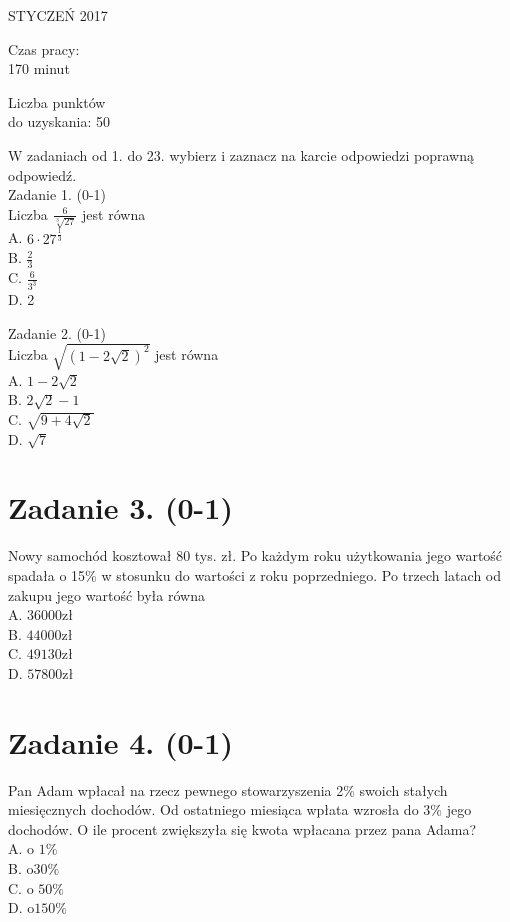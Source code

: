 \documentclass[10pt]{article}
\begin{document}
STYCZEŃ 2017

Czas pracy:\\
170 minut

Liczba punktów\\
do uzyskania: 50

W zadaniach od 1. do 23. wybierz i zaznacz na karcie odpowiedzi poprawną odpowiedź.\\
Zadanie 1. (0-1)\\
Liczba \(\frac{6}{\sqrt[3]{27}}\) jest równa\\
A. \(6 \cdot 27^{\frac{1}{3}}\)\\
B. \(\frac{2}{3}\)\\
C. \(\frac{6}{3^{3}}\)\\
D. 2

Zadanie 2. (0-1)\\
Liczba \(\sqrt{(1-2 \sqrt{2})^{2}}\) jest równa\\
A. \(1-2 \sqrt{2}\)\\
B. \(2 \sqrt{2}-1\)\\
C. \(\sqrt{9+4 \sqrt{2}}\)\\
D. \(\sqrt{7}\)

\section*{Zadanie 3. (0-1)}
Nowy samochód kosztował 80 tys. zł. Po każdym roku użytkowania jego wartość spadała o 15\% w stosunku do wartości z roku poprzedniego. Po trzech latach od zakupu jego wartość była równa\\
A. \(36000 \mathrm{zł}\)\\
B. \(44000 \mathrm{zł}\)\\
C. \(49130 \mathrm{zł}\)\\
D. \(57800 \mathrm{zł}\)

\section*{Zadanie 4. (0-1)}
Pan Adam wpłacał na rzecz pewnego stowarzyszenia 2\% swoich stałych miesięcznych dochodów. Od ostatniego miesiąca wpłata wzrosła do \(3 \%\) jego dochodów. O ile procent zwiększyła się kwota wpłacana przez pana Adama?\\
A. o \(1 \%\)\\
B. \(\mathrm{o} 30 \%\)\\
C. o \(50 \%\)\\
D. \(\mathrm{o} 150 \%\)
\end{document}
